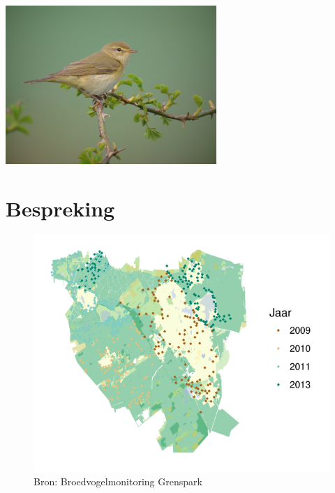 \documentclass[11pt]{book}
\begin{document}
\begin{multicols}{2}

\includegraphics[width=8cm]{Foto's/Fitis.jpg}
\section{Bespreking}
\lipsum[1-2]
  \begin{figure}[H]
  \includegraphics{Grenspark/Fitis.pdf}
  \vspace{-1.2em}
   \caption*{Bron: Broedvogelmonitoring Grenspark}   
  \end{figure}
  
\lipsum[1]


\end{multicols}
\end{document}
